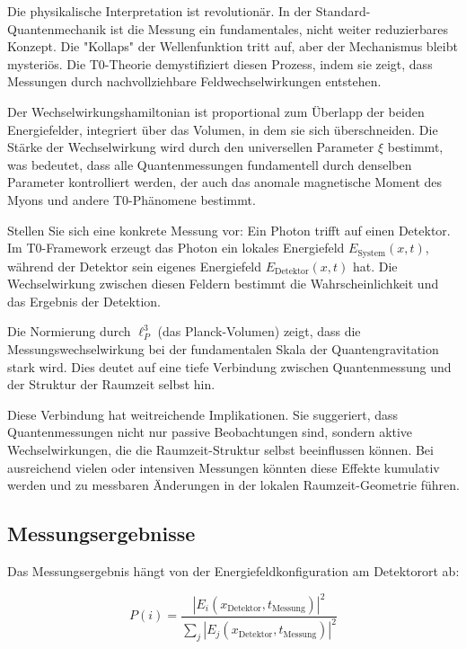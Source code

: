 \documentclass[12pt,a4paper]{article}
\newcommand{\xipar}{\xi}
\theoremstyle{definition}
\theoremstyle{remark}
\begin{document}
Die physikalische Interpretation ist revolutionär. In der Standard-Quantenmechanik ist die Messung ein fundamentales, nicht weiter reduzierbares Konzept. Die "Kollaps" der Wellenfunktion tritt auf, aber der Mechanismus bleibt mysteriös. Die T0-Theorie demystifiziert diesen Prozess, indem sie zeigt, dass Messungen durch nachvollziehbare Feldwechselwirkungen entstehen.

Der Wechselwirkungshamiltonian ist proportional zum Überlapp der beiden Energiefelder, integriert über das Volumen, in dem sie sich überschneiden. Die Stärke der Wechselwirkung wird durch den universellen Parameter $\xipar$ bestimmt, was bedeutet, dass alle Quantenmessungen fundamentell durch denselben Parameter kontrolliert werden, der auch das anomale magnetische Moment des Myons und andere T0-Phänomene bestimmt.

Stellen Sie sich eine konkrete Messung vor: Ein Photon trifft auf einen Detektor. Im T0-Framework erzeugt das Photon ein lokales Energiefeld $E_{\text{System}}(x,t)$, während der Detektor sein eigenes Energiefeld $E_{\text{Detektor}}(x,t)$ hat. Die Wechselwirkung zwischen diesen Feldern bestimmt die Wahrscheinlichkeit und das Ergebnis der Detektion.

Die Normierung durch $\ell_P^3$ (das Planck-Volumen) zeigt, dass die Messungswechselwirkung bei der fundamentalen Skala der Quantengravitation stark wird. Dies deutet auf eine tiefe Verbindung zwischen Quantenmessung und der Struktur der Raumzeit selbst hin.

Diese Verbindung hat weitreichende Implikationen. Sie suggeriert, dass Quantenmessungen nicht nur passive Beobachtungen sind, sondern aktive Wechselwirkungen, die die Raumzeit-Struktur selbst beeinflussen können. Bei ausreichend vielen oder intensiven Messungen könnten diese Effekte kumulativ werden und zu messbaren Änderungen in der lokalen Raumzeit-Geometrie führen.

\subsection{Messungsergebnisse}

Das Messungsergebnis hängt von der Energiefeldkonfiguration am Detektorort ab:

\begin{equation}
	P(i) = \frac{|E_i(x_{\text{Detektor}}, t_{\text{Messung}})|^2}{\sum_j |E_j(x_{\text{Detektor}}, t_{\text{Messung}})|^2}
	\label{eq:measurement_probability}
\end{equation}
\end{document}
